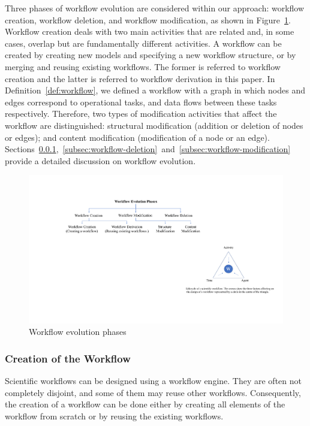 \documentclass[ao]{iosart2x}
\begin{document}
Three phases of workflow evolution are considered within our approach: workflow creation, workflow deletion, and workflow modification, as shown in Figure~\ref{fig:workflow-evolution}. 
Workflow creation deals with two main activities that are related and, in some cases, overlap but are fundamentally different activities. A workflow can be created by creating new models and specifying a new workflow structure, or by merging and reusing existing workflows. The former is referred to workflow creation and the latter is referred to workflow derivation in this paper.
In Definition~\ref{def:workflow}, we defined a workflow with a graph in which nodes and edges correspond to operational tasks, and data flows between these tasks respectively. Therefore, two types of modification activities that affect the workflow are distinguished: structural modification (addition or deletion of nodes or edges); and content modification (modification of a node or an edge).
Sections~\ref{subsec:workflow-creation},~\ref{subsec:workflow-deletion}~and~\ref{subsec:workflow-modification} provide a detailed discussion on workflow evolution. 

\begin{figure}[htpb]
    \centering
    \includegraphics[width=0.8\linewidth]{figures/workflow-evolution-lifecycle.pdf}
    \caption{Workflow evolution phases}
    \label{fig:workflow-evolution}
\end{figure}

\subsubsection{Creation of the Workflow}
\label{subsec:workflow-creation}

Scientific workflows can be designed using a workflow engine. They are often not completely disjoint, and some of them may reuse other workflows. Consequently, the creation of a workflow can be done either by creating all elements of the workflow from scratch or by reusing the existing workflows.
\end{document}
